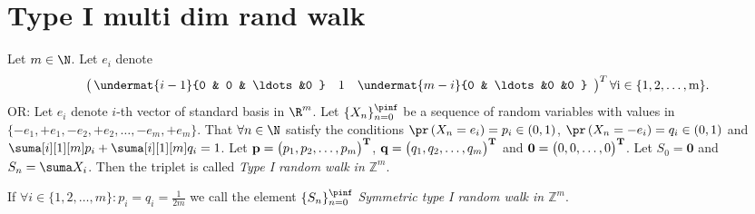 \chapter{Type I multi dim rand walk}
\begin{defn}\label{defn-type_I}
  Let $m \in \N$. Let $e_i$ denote \[\left(
  \begin{array}{@{\,}ccccccccc@{\,}}
  \undermat{i-1\vphantom{m-1}}{0 & 0 & \ldots&0 } & 1& \undermat{m-i}{0 & \ldots &0 &0 }\\
  \end{array}
  \right)^T\rm
  \forall i \in \{1, 2, \ldots, m\}.\] OR: Let $e_i$ denote $i$-th vector of standard basis in $\R^m$. Let $\{X_n\}_{n=0}^\pinf$ be a sequence of \iid random variables with values in $\{ -e_1, +e_1, -e_2, +e_2, \ldots, -e_m, +e_m\}$.
  That $\forall n \in \N$ satisfy the conditions $\pr\left(X_n=e_i \right)=p_i \in \left(0,1\right)$, $\pr\left(X_n=-e_i \right)=q_i \in \left(0,1\right)$ and $\suma[i][1][m] p_i+\suma[i][1][m]q_i=1$.
  Let $\bf{p}=\begin{pmatrix}
   p_1, p_2, \ldots, p_m
 \end{pmatrix}^T$, $\bf{q}=\begin{pmatrix}
   q_1, q_2, \ldots, q_m
 \end{pmatrix}^T$ and $\bf{0}=\begin{pmatrix}
    0, 0, \ldots, 0
  \end{pmatrix}^T$. Let $S_0=\textbf{0}$ and $S_n=\suma X_i$. Then the \ce triplet \rw is called \emph{Type I random walk in $\mathbb{Z}^m$}.

  If $\forall i \in \{1, 2, \ldots, m\}: p_i=q_i=\frac{1}{2m}$ we call the \ce element $\{S_n\}_{n=0}^\pinf$ \emph{Symmetric type I random walk in $\mathbb{Z}^m$}.
\end{defn}

